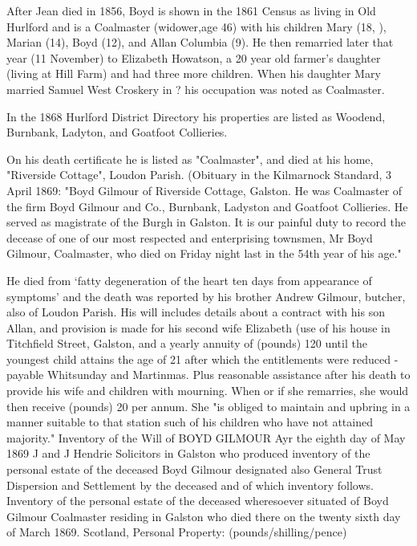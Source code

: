 After Jean died in 1856, Boyd is shown in the 1861 Census as living in Old Hurlford and is a Coalmaster (widower,age 46) with his children Mary (18, ), Marian (14), Boyd (12), and Allan Columbia (9). He then remarried later that year (11 November) to Elizabeth Howatson, a 20 year old farmer's daughter (living at Hill Farm) and had three more children.
When his daughter Mary married Samuel West Croskery in ? his occupation was noted as Coalmaster.\cite{SMWCmarriage}

In the 1868 Hurlford District Directory his properties are listed as Woodend, Burnbank, Ladyton, and Goatfoot Collieries.

On his death certificate he is listed as "Coalmaster", and died at his home, "Riverside Cottage", Loudon Parish. (Obituary in the Kilmarnock Standard, 3 April 1869:  "Boyd Gilmour of Riverside Cottage, Galston. He was Coalmaster of the firm Boyd Gilmour and Co., Burnbank, Ladyston and Goatfoot Collieries. He served as magistrate of the Burgh in Galston. It is our painful duty to record the decease of one of our most respected and enterprising townsmen, Mr Boyd Gilmour, Coalmaster, who died on Friday night last in the 54th year of his age." \cite{BGobituary}

  He died from `fatty degeneration of the heart ten days from appearance of symptoms' and the death was reported by his brother Andrew Gilmour, butcher, also of Loudon Parish. His will includes details about a contract with his son Allan, and provision is made for his second wife Elizabeth (use of his house in Titchfield Street, Galston, and a yearly annuity of (pounds) 120 until the youngest child attains the age of 21 after which the entitlements were reduced - payable Whitsunday and Martinmas. Plus reasonable assistance after his death to provide his wife and children with mourning. When or if she remarries, she would then receive (pounds) 20 per annum. She "is obliged to maintain and upbring in a manner suitable to that station such of his children who have not attained majority."      Inventory of the Will of BOYD GILMOUR
    Ayr the eighth day of May 1869 J and J Hendrie Solicitors in Galston who produced inventory of the personal estate of the deceased Boyd Gilmour designated also General Trust Dispersion and Settlement by the deceased and of which inventory follows.
    Inventory of the personal estate of the deceased wheresoever situated of Boyd Gilmour Coalmaster residing in Galston who died there on the twenty sixth day of March 1869.
    Scotland, Personal Property:
    (pounds/shilling/pence)


